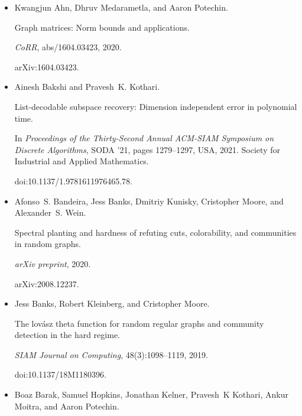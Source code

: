 \documentclass[10pt,a4paper]{article}
\begin{document}
\begin{itemize}


\item[] 
[1]

Kwangjun Ahn, Dhruv Medarametla, and Aaron Potechin.


Graph matrices: Norm bounds and applications.


\emph{CoRR}, abs/1604.03423, 2020.


arXiv:1604.03423.





\item[] 
[2]

Ainesh Bakshi and Pravesh K. Kothari.


List-decodable subspace recovery: Dimension independent error in
polynomial time.


In \emph{Proceedings of the Thirty-Second Annual ACM-SIAM Symposium on
Discrete Algorithms}, SODA ’21, pages 1279–1297, USA, 2021. Society for
Industrial and Applied Mathematics.


doi:10.1137/1.9781611976465.78.





\item[] 
[3]

Afonso S. Bandeira, Jess Banks, Dmitriy Kunisky, Cristopher Moore, and
Alexander S. Wein.


Spectral planting and hardness of refuting cuts, colorability, and
communities in random graphs.


\emph{arXiv preprint}, 2020.


arXiv:2008.12237.





\item[] 
[4]

Jess Banks, Robert Kleinberg, and Cristopher Moore.


The lovász theta function for random regular graphs and community
detection in the hard regime.


\emph{SIAM Journal on Computing}, 48(3):1098–1119, 2019.


doi:10.1137/18M1180396.





\item[] 
[5]

Boaz Barak, Samuel Hopkins, Jonathan Kelner, Pravesh K Kothari, Ankur Moitra,
and Aaron Potechin.



\end{itemize}
\end{document}
